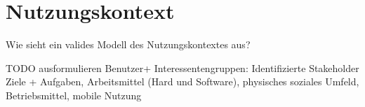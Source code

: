 
\section{Nutzungskontext}

Wie sieht ein valides Modell des Nutzungskontextes aus?	  
 
TODO ausformulieren
Benutzer+ Interessentengruppen: Identifizierte Stakeholder
Ziele +  Aufgaben, Arbeitsmittel (Hard und Software), physisches soziales Umfeld, Betriebsmittel, mobile Nutzung
 


